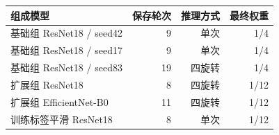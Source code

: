 \begin{tabular}{lrrr}
\toprule
组成模型 & 保存轮次 & 推理方式 & 最终权重 \\
\midrule
基础组 ResNet18 / seed42 & 9 & 单次 & 1/4 \\
基础组 ResNet18 / seed17 & 9 & 单次 & 1/4 \\
基础组 ResNet18 / seed83 & 19 & 四旋转 & 1/4 \\
扩展组 ResNet18 & 8 & 四旋转 & 1/12 \\
扩展组 EfficientNet-B0 & 11 & 四旋转 & 1/12 \\
训练标签平滑 ResNet18 & 8 & 单次 & 1/12 \\
\bottomrule
\end{tabular}
